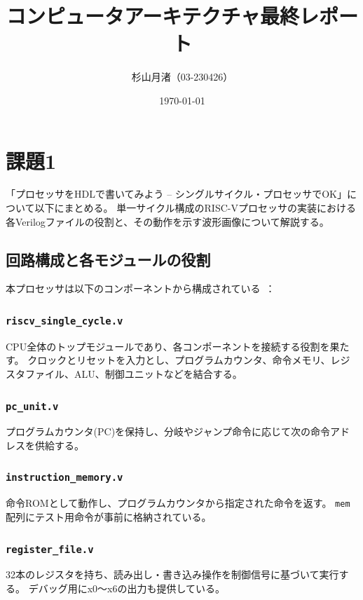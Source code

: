 \documentclass[a4paper, 11pt]{article}
\title{コンピュータアーキテクチャ最終レポート}
\author{杉山月渚（03-230426）}
\date{\today}
\begin{document}
\maketitle

\section{課題1}
「プロセッサをHDLで書いてみよう – シングルサイクル・プロセッサでOK」について以下にまとめる。
単一サイクル構成のRISC-Vプロセッサの実装における各Verilogファイルの役割と、その動作を示す波形画像について解説する。

\subsection{回路構成と各モジュールの役割}
本プロセッサは以下のコンポーネントから構成されている~\cite{sakai2004computer_architecture}：

\subsubsection{\texttt{riscv\_single\_cycle.v}}
CPU全体のトップモジュールであり、各コンポーネントを接続する役割を果たす。
クロックとリセットを入力とし、プログラムカウンタ、命令メモリ、レジスタファイル、ALU、制御ユニットなどを結合する。



\subsubsection{\texttt{pc\_unit.v}}
プログラムカウンタ(PC)を保持し、分岐やジャンプ命令に応じて次の命令アドレスを供給する。



\subsubsection{\texttt{instruction\_memory.v}}
命令ROMとして動作し、プログラムカウンタから指定された命令を返す。
\texttt{mem}配列にテスト用命令が事前に格納されている。



\subsubsection{\texttt{register\_file.v}}
32本のレジスタを持ち、読み出し・書き込み操作を制御信号に基づいて実行する。
デバッグ用にx0〜x6の出力も提供している。
\end{document}
